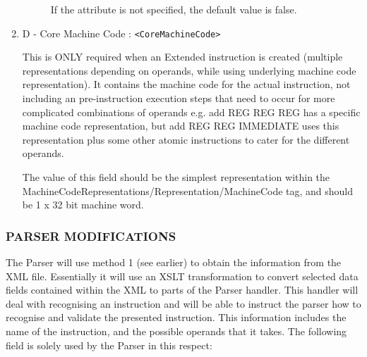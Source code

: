 \begin{enumerate}
\begin{description}
If the attribute is not specified, the default value is false.



\end{description}


\item D - Core Machine Code : \verb"<CoreMachineCode>"

This is ONLY required when an Extended instruction is created (multiple representations depending on operands, while using underlying machine code representation). It contains the machine code for the actual instruction, not including an pre-instruction execution steps that need to occur for more complicated combinations of operands e.g. add REG REG REG has a specific machine code representation, but add REG REG IMMEDIATE uses this representation plus some other atomic instructions to cater for the different operands.

The value of this field should be the simplest representation within the MachineCodeRepresentations/Representation/MachineCode tag, and should be 1 x 32 bit machine word.


\end{enumerate}


\subsubsection{PARSER MODIFICATIONS}

The Parser will use method 1 (see earlier) to obtain the information from the XML file. Essentially it will use an XSLT transformation to convert selected data fields contained within the XML to parts of the Parser handler. This handler will deal with recognising an instruction and will be able to instruct the parser how to recognise and validate the presented instruction. This information includes the name of the instruction, and the possible operands that it takes. The following field is solely used by the Parser in this respect:

